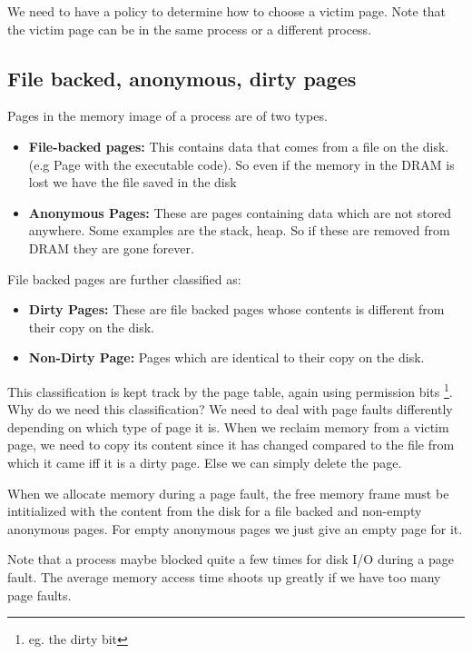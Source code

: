 \documentclass[12pt]{article}
\begin{document}
We need to have a policy to determine how to choose a victim page. Note that the victim page can be in the same process or a different process.  

\subsection*{File backed, anonymous, dirty pages}
Pages in the memory image of a process are of two types.
\begin{itemize}[topsep=0pt, partopsep=0pt, itemsep=0pt, parsep=0pt]        
    \item \textbf{File-backed pages:} This contains data that comes from a file on the disk. (e.g Page with the executable code). So even if the memory in the DRAM is lost we have the file saved in the disk
    \item \textbf{Anonymous Pages:} These are pages containing data which are not stored anywhere. Some examples are the stack, heap. So if these are removed from DRAM they are gone forever.
\end{itemize}

File backed pages are further classified as:
\begin{itemize}[topsep=0pt, partopsep=0pt, itemsep=0pt, parsep=0pt]
    \item \textbf{Dirty Pages:} These are file backed pages whose contents is different from their copy on the disk.
    \item \textbf{Non-Dirty Page:} Pages which are identical to their copy on the disk.
\end{itemize}

This classification is kept track by the page table, again using permission bits \footnote{eg. the dirty bit}.
Why do we need this classification? We need to deal with page faults differently depending on which type of page it is.
When we reclaim memory from a victim page, we need to copy its content since it has changed compared to the file from which it came iff it is a dirty page. Else we can simply delete the page.

When we allocate memory during a page fault, the free memory frame must be intitialized with the content from the disk for 
a file backed and non-empty anonymous pages. For empty anonymous pages we just give an empty page for it. 

Note that a process maybe blocked quite a few times for disk I/O during a page fault. The average memory access time shoots up greatly if we have too many page faults. 
\end{document}
